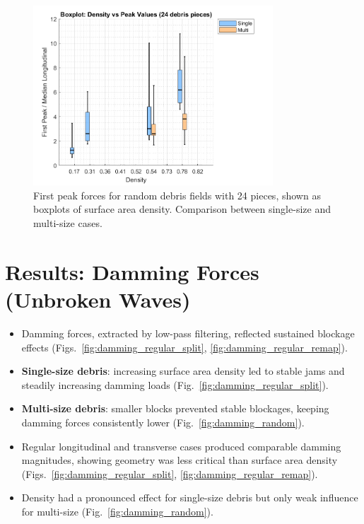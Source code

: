 \documentclass{article}
\begin{document}
\begin{figure}[htbp]
    \centering
    \includegraphics[width=0.8\textwidth]{Boxplot_Density_vs_PeakValues_24Debris.png}
    \caption{First peak forces for random debris fields with 24 pieces, shown as boxplots of surface area density. Comparison between single-size and multi-size cases.}
    \label{fig:boxplot_24}
\end{figure}

\section{Results: Damming Forces (Unbroken Waves)}
\begin{itemize}
    \item Damming forces, extracted by low-pass filtering, reflected sustained blockage effects (Figs.~\ref{fig:damming_regular_split}, \ref{fig:damming_regular_remap}).
    \item \textbf{Single-size debris}: increasing surface area density led to stable jams and steadily increasing damming loads (Fig.~\ref{fig:damming_regular_split}).
    \item \textbf{Multi-size debris}: smaller blocks prevented stable blockages, keeping damming forces consistently lower (Fig.~\ref{fig:damming_random}).
    \item Regular longitudinal and transverse cases produced comparable damming magnitudes, showing geometry was less critical than surface area density (Figs.~\ref{fig:damming_regular_split}, \ref{fig:damming_regular_remap}).
    \item Density had a pronounced effect for single-size debris but only weak influence for multi-size (Fig.~\ref{fig:damming_random}).
\end{itemize}
\end{document}

